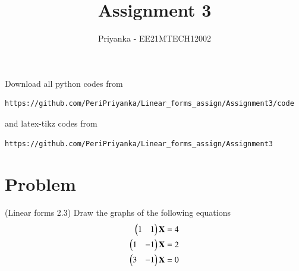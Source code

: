 \documentclass[journal,12pt,twocolumn]{IEEEtran}
\begin{document}
     \def\rightbox#1{\makebox[0in][r]{#1}}
     \def\centbox#1{\makebox[0in]{#1}}
     \def\topbox#1{\raisebox{-\baselineskip}[0in][0in]{#1}}
     \def\midbox#1{\raisebox{-0.5\baselineskip}[0in][0in]{#1}}
\vspace{3cm}
\title{Assignment 3}
\author{Priyanka - EE21MTECH12002}
\maketitle
\newpage
\bigskip
\renewcommand{\thefigure}{\theenumi}
\renewcommand{\thetable}{\theenumi}
Download all python codes from 
\begin{lstlisting}
https://github.com/PeriPriyanka/Linear_forms_assign/Assignment3/code
\end{lstlisting}
%
and latex-tikz codes from 
%
\begin{lstlisting}
https://github.com/PeriPriyanka/Linear_forms_assign/Assignment3
\end{lstlisting}
\section{Problem}
(Linear forms 2.3) Draw the graphs of the following equations\\
\begin{align}
\begin{pmatrix}1& 1\end{pmatrix}\mathbf{X}=4\\
\begin{pmatrix}1&-1\end{pmatrix}\mathbf{X}=2\\
\begin{pmatrix}3&-1\end{pmatrix}\mathbf{X}=0
\end{align}
\end{document}
